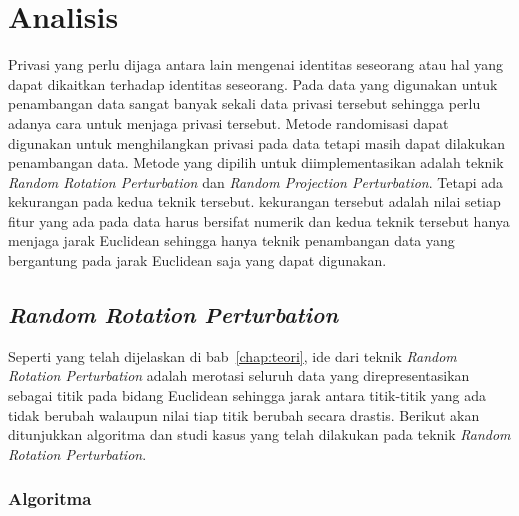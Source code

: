 \chapter{Analisis}
\label{chap:analisis}

Privasi yang perlu dijaga antara lain mengenai identitas seseorang atau hal yang dapat dikaitkan terhadap identitas seseorang. Pada data yang digunakan untuk penambangan data sangat banyak sekali data privasi tersebut sehingga perlu adanya cara untuk menjaga privasi tersebut. Metode randomisasi dapat digunakan untuk menghilangkan privasi pada data tetapi masih dapat dilakukan penambangan data. Metode yang dipilih untuk diimplementasikan adalah teknik \textit{Random Rotation Perturbation} dan \textit{Random Projection Perturbation}. Tetapi ada kekurangan pada kedua teknik tersebut. kekurangan tersebut adalah nilai setiap fitur yang ada pada data harus bersifat numerik dan kedua teknik tersebut hanya menjaga jarak Euclidean sehingga hanya teknik penambangan data yang bergantung pada jarak Euclidean saja yang dapat digunakan.

\section{\textit{Random Rotation Perturbation}}
\label{subsec:rrp}

Seperti yang telah dijelaskan di bab~\ref{chap:teori}, ide dari teknik \textit{Random Rotation Perturbation} adalah merotasi seluruh data yang direpresentasikan sebagai titik pada bidang Euclidean sehingga jarak antara titik-titik yang ada tidak berubah walaupun nilai tiap titik berubah secara drastis. Berikut akan ditunjukkan algoritma dan studi kasus yang telah dilakukan pada teknik \textit{Random Rotation Perturbation}.

\subsection{Algoritma}
\label{subsec:algo-rotation}

